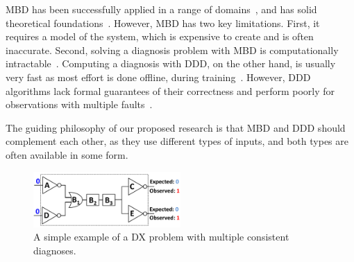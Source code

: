 \documentclass[12pt]{article}
\begin{document}
MBD has been successfully applied in a range of domains~\cite{williams96,struss2003model,wotawa2002model}, and has solid theoretical foundations~\cite{deKleer1987diagnosing,reiter1987theory}. However, MBD has two key limitations. First, it requires a model of the system, which is expensive to create and is often inaccurate. Second, solving a diagnosis problem with MBD is computationally intractable~\cite{bylander1991computational}. Computing a diagnosis with DDD, on the other hand, is usually very fast as most effort is done offline, during training~\cite{muralidharan2014fault}. However, DDD algorithms lack formal guarantees of their correctness and perform poorly for observations with multiple faults~\cite{keren2011model}. 


The guiding philosophy of our proposed research is that MBD and DDD should complement each other, as they use different types of inputs, and both types are often available in some form. 



\begin{figure}
    \centering
	\includegraphics[width=0.5\textwidth]{mbd-example_cropped.pdf}
    \caption{A simple example of a DX problem with multiple consistent diagnoses.}
    \label{fig:mbd-example}
\end{figure}

\end{document}
